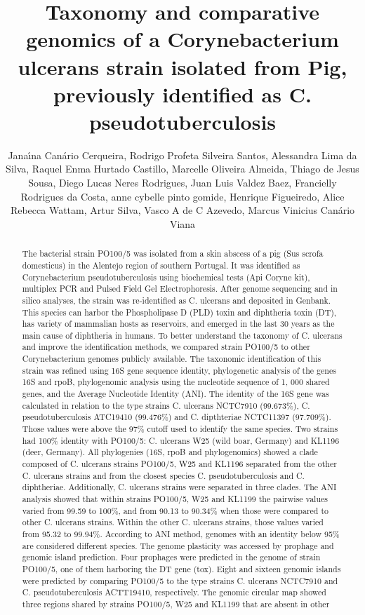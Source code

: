 \documentclass[twoside]{article}
\title{\vspace{-15mm}\fontsize{24pt}{10pt}\selectfont\textbf{ Taxonomy and comparative genomics of a Corynebacterium ulcerans strain isolated from Pig,  previously identified as C. pseudotuberculosis }} %
\author{ Jana\'{\i}na Can\'ario Cerqueira, Rodrigo Profeta Silveira Santos, Alessandra Lima da Silva, Raquel Enma Hurtado Castillo, Marcelle Oliveira Almeida, Thiago de Jesus Sousa, Diego Lucas Neres Rodrigues, Juan Luis Valdez Baez, Francielly Rodrigues da Costa, anne cybelle pinto gomide, Henrique Figueiredo, Alice Rebecca Wattam, Artur Silva, Vasco A de C Azevedo, Marcus Vinicius Can\'ario Viana }
\affil{ University of Virginia }
\date{}
\begin{document}
  
  
  \maketitle %
  
  
  \thispagestyle{fancy} %
  
  
  \begin{abstract}
  The bacterial strain PO100/5 was isolated from a skin abscess of a pig (Sus scrofa domesticus) in the Alentejo region of southern Portugal. It was identified as Corynebacterium pseudotuberculosis using biochemical tests (Api Coryne\textsuperscript{\textcopyright} kit),  multiplex PCR and Pulsed Field Gel Electrophoresis. After genome sequencing and in silico analyses,  the strain was re-identified as C. ulcerans and deposited in Genbank. This species can harbor the Phospholipase D (PLD) toxin and diphtheria toxin (DT),  has variety of mammalian hosts as reservoirs,  and emerged in the last 30 years as the main cause of diphtheria in humans. To better understand the taxonomy of C. ulcerans and improve the identification methods,  we compared strain PO100/5 to other Corynebacterium genomes publicly available. The taxonomic identification of this strain was refined using 16S gene sequence identity,  phylogenetic analysis of the genes 16S and rpoB,  phylogenomic analysis using the nucleotide sequence of 1, 000 shared genes,  and the Average Nucleotide Identity (ANI). The identity of the 16S gene was calculated in relation to the type strains C. ulcerans NCTC7910 (99.673\%),  C. pseudotuberculosis ATC19410 (99.476\%) and C. dipthteriae NCTC11397 (97.709\%). Those values were above the 97\% cutoff used to identify the same species. Two strains had 100\% identity with PO100/5: C. ulcerans W25 (wild boar,  Germany) and KL1196 (deer,  Germany). All phylogenies (16S,  rpoB and phylogenomics) showed a clade composed of C. ulcerans strains PO100/5,  W25 and KL1196 separated from the other C. ulcerans strains and from the closest species C. pseudotuberculosis and C. diphtheriae. Additionally,  C. ulcerans strains were separated in three clades. The ANI analysis showed that within strains PO100/5,  W25 and KL1199 the pairwise values varied from 99.59 to 100\%,  and from 90.13 to 90.34\% when those were compared to other C. ulcerans strains. Within the other C. ulcerans strains,  those values varied from 95.32 to 99.94\%. According to ANI method,  genomes with an identity below 95\% are considered different species. The genome plasticity was accessed by prophage and genomic island prediction. Four prophages were predicted in the genome of strain PO100/5,  one of them harboring the DT gene (tox). Eight and sixteen genomic islands were predicted by comparing PO100/5 to the type strains C. ulcerans NCTC7910 and C. pseudotuberculosis ACTT19410,  respectively. The genomic circular map showed three regions shared by strains PO100/5,  W25 and KL1199 that are absent in other 
\end{abstract}
\end{document}
